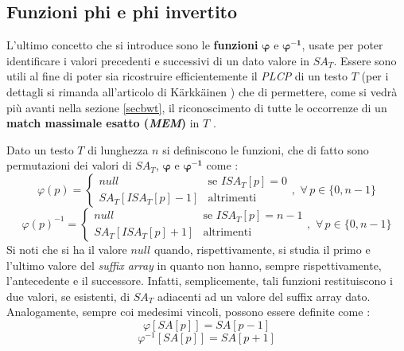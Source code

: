 \subsection{Funzioni phi e phi invertito}
L'ultimo concetto che si introduce sono le \textbf{funzioni}
$\boldsymbol\varphi$ e $\mathbf{\boldsymbol\varphi^{-1}}$, usate per poter
identificare i valori precedenti e successivi di 
un dato valore in $SA_T$. Essere sono utili al fine di poter sia ricostruire
efficientemente il \textit{PLCP} di un testo $T$ (per i dettagli si rimanda
all'articolo di K\"{a}rkk\"{a}inen \cite{plcp}) che di permettere, come si vedrà
più  avanti nella sezione \ref{secbwt}, il riconoscimento di tutte le occorrenze
di un \textbf{match massimale esatto (\textit{MEM})} in $T$ \cite{phoni}.
\begin{definizione}
  Dato un testo $T$ di lunghezza $n$ si definiscono le funzioni, che di fatto
  sono permutazioni dei valori di $SA_T$, $\boldsymbol\varphi$ e
  $\mathbf{\boldsymbol\varphi^{-1}}$ come \cite{phoni}: 
  \begin{equation}
    \label{eq:phidef1}
    \varphi(p)=
    \begin{cases}
      null&\mbox{se } ISA_T[p]=0\\
      SA_T[ISA_T[p]-1]&\mbox{altrimenti}
    \end{cases},\,\,\forall\, p\in\{0,n-1\}
  \end{equation}
  \begin{equation}
    \label{eq:phiinvdef1}
    \varphi(p)^{-1}=
    \begin{cases}
      null&\mbox{se } ISA_T[p]=n-1\\
      SA_T[ISA_T[p]+1]&\mbox{altrimenti}
    \end{cases},\,\,\forall\, p\in\{0,n-1\}
  \end{equation}
  Si noti che si ha il valore $null$ quando, rispettivamente, si studia il
  primo e l'ultimo valore del \textit{suffix array} in quanto non hanno, sempre
  rispettivamente, l'antecedente e il successore.   Infatti, semplicemente, tali
  funzioni restituiscono i due valori, se 
  esistenti, di $SA_T$ adiacenti ad un valore del suffix array dato.\\
  Analogamente, sempre coi medesimi vincoli, possono essere definite come
  \cite{plcp}: 
  \begin{equation}
    \label{eq:phidef2}
    \varphi[SA[p]]=SA[p-1]
  \end{equation}
  \begin{equation}
    \label{eq:phiinvdef2}
    \varphi^{-1}[SA[p]]=SA[p+1]
  \end{equation}

\end{definizione}
